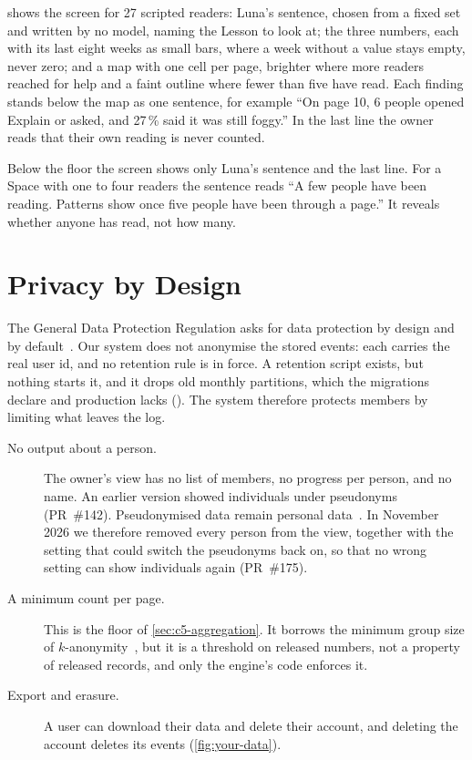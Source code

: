  shows the screen for 27 scripted readers: Luna's sentence, chosen from a fixed set and written by no model,
naming the Lesson to look at; the three numbers, each with its last eight
weeks as small bars, where a week without a value stays empty, never zero;
and a map with one cell per page, brighter where more readers reached for
help and a faint outline where fewer than five have read. Each finding stands
below the map as one sentence, for example
\enquote{On page 10, 6 people opened Explain or asked, and 27\,\% said it was
still foggy.} In the last line the owner reads that their own reading is never
counted.

Below the floor the screen shows only Luna's sentence and the last line. For
a Space with one to four readers the sentence reads \enquote{A few people have
been reading. Patterns show once five people have been through a page.} It
reveals whether anyone has read, not how many.

\section{Privacy by Design}
\label{sec:c5-privacy}

The General Data Protection Regulation asks for data protection by design and
by default~\cite{gdpr2016}. Our system does not anonymise the stored events:
each carries the real user id, and no retention rule is in force. A retention
script exists, but nothing starts it, and it drops old monthly partitions,
which the migrations declare and production lacks
().
The system therefore protects members by limiting what leaves the log.

\begin{description}
  \item[No output about a person.] The owner's view has no list of members, no
    progress per person, and no name. An earlier version showed individuals
    under pseudonyms (PR~\#142). Pseudonymised data remain personal
    data~\cite[Recital~26]{gdpr2016}. In November 2026 we therefore removed
    every person from the view, together with the setting that could switch
    the pseudonyms back on, so that no wrong setting can show individuals
    again (PR~\#175).
  \item[A minimum count per page.] This is the floor of
    \cref{sec:c5-aggregation}. It borrows the minimum group size of
    $k$-anonymity~\cite{sweeney2002kanonymity}, but it is a threshold on
    released numbers, not a property of released records, and only the
    engine's code enforces it.
  \item[Export and erasure.] A user can download their data and delete their
    account, and deleting the account deletes its events
    (\cref{fig:your-data}).
\end{description}

